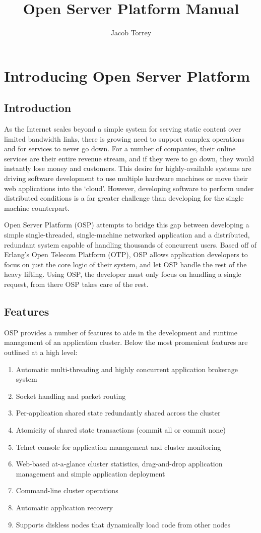 \documentclass{book}
\author{Jacob Torrey}
\title{Open Server Platform Manual}
\begin{document}
\maketitle{}
\chapter{Introducing Open Server Platform}
\section{Introduction}
As the Internet scales beyond a simple system for serving static content over
limited bandwidth links, there is growing need to support complex operations
and for services to never go down. For a number of companies, their online
services are their entire revenue stream, and if they were to go down, they
would instantly lose money and customers. This desire for highly-available
systems are driving software development to use multiple hardware machines or
move their web applications into the `cloud'. However, developing software to 
perform under distributed conditions is a far greater challenge than developing
for the single machine counterpart.

Open Server Platform (OSP) attempts to bridge this gap between developing a
simple single-threaded, single-machine networked application and a distributed,
redundant system capable of handling thousands of concurrent users. Based off
of Erlang's Open Telecom Platform (OTP), OSP allows application developers to 
focus on just the core logic of their system, and let OSP handle the rest of
the heavy lifting. Using OSP, the developer must only focus on handling a 
single request, from there OSP takes care of the rest.

\section{Features}
OSP provides a number of features to aide in the development and runtime
management of an application cluster. Below the most promenient features are 
outlined at a high level:

\begin{enumerate}
\item Automatic multi-threading and highly concurrent application brokerage
system
\item Socket handling and packet routing
\item Per-application shared state redundantly shared across the cluster
\item Atomicity of shared state transactions (commit all or commit none)
\item Telnet console for application management and cluster monitoring
\item Web-based at-a-glance cluster statistics, drag-and-drop application
management and simple application deployment
\item Command-line cluster operations
\item Automatic application recovery
\item Supports diskless nodes that dynamically load code from other nodes
\end{enumerate}
\end{document}
